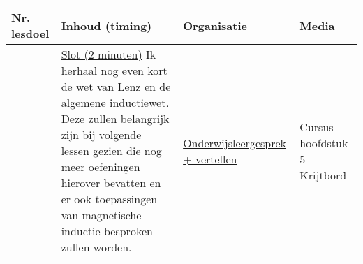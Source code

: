 \begin{landscape}
\begin{tabularx}{1.56\textwidth}{|p{1.5cm}|p{8cm}|X|p{4cm}|}
	\hline
	\textbf{Nr. lesdoel } & \textbf{Inhoud (timing)}  & \textbf{Organisatie } & \textbf{Media } \\ \hline
	& \underline{Slot (2 minuten)}\newline
	Ik herhaal nog even kort de wet van Lenz en de algemene inductiewet. Deze zullen belangrijk zijn bij volgende lessen gezien die nog meer oefeningen hierover bevatten en er ook toepassingen van magnetische inductie besproken zullen worden.	
	&  \underline{Onderwijsleergesprek + vertellen}\newline 
	&  Cursus hoofdstuk 5 \newline\newline Krijtbord
	\\ \hline
\end{tabularx}

	
\end{landscape}



%
%
%
%
%
%
%
%
%
%